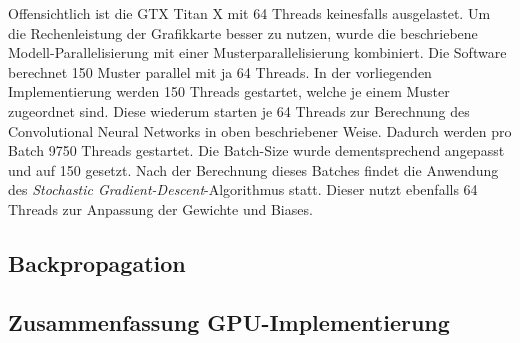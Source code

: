 \documentclass[../main.tex]{subfiles}
\begin{document}
Offensichtlich ist die GTX Titan X mit 64 Threads keinesfalls ausgelastet. Um die Rechenleistung der Grafikkarte besser zu nutzen, wurde die beschriebene Modell-Parallelisierung mit einer Musterparallelisierung kombiniert. Die Software berechnet 150 Muster parallel mit ja 64 Threads. In der vorliegenden Implementierung werden 150 Threads gestartet, welche je einem Muster zugeordnet sind. Diese wiederum starten je 64 Threads zur Berechnung des Convolutional Neural Networks in oben beschriebener Weise. Dadurch werden pro Batch 9750 Threads gestartet. Die Batch-Size wurde dementsprechend angepasst und auf 150 gesetzt. Nach der Berechnung dieses Batches findet die Anwendung des \emph{Stochastic Gradient-Descent}-Algorithmus statt. Dieser nutzt ebenfalls 64 Threads zur Anpassung der Gewichte und Biases. \par 
\subsection{Backpropagation} \label{sec:cuda_back}
\subsection{Zusammenfassung GPU-Implementierung} \label{sec:cuda_zusammenfassung}
\end{document}

